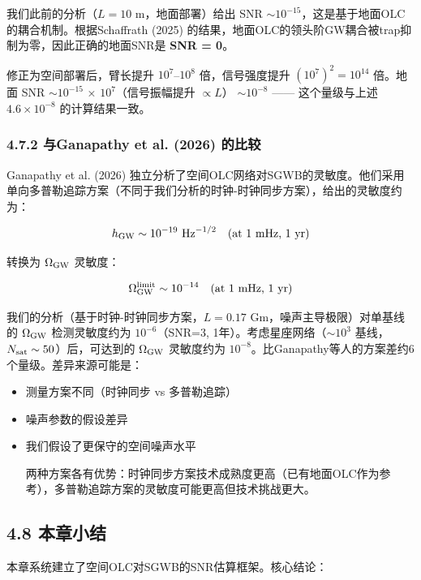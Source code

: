 \documentclass[12pt,a4paper]{article}
\begin{document}
我们此前的分析（$L = 10$ m，地面部署）给出 SNR $\sim 10^{-15}$，这是基于地面OLC的耦合机制。根据Schaffrath (2025) 的结果，地面OLC的领头阶GW耦合被trap抑制为零，因此正确的地面SNR是 \textbf{SNR = 0}。

修正为空间部署后，臂长提升 $10^7$–$10^8$ 倍，信号强度提升 $(10^7)^2 = 10^{14}$ 倍。地面 SNR $\sim 10^{-15}$ × $10^7$（信号振幅提升 $\propto L$） $\sim 10^{-8}$ —— 这个量级与上述 $4.6 \times 10^{-8}$ 的计算结果一致。

\subsubsection{4.7.2 与Ganapathy et al. (2026) 的比较}


Ganapathy et al. (2026) 独立分析了空间OLC网络对SGWB的灵敏度\cite{ref11}。他们采用单向多普勒追踪方案（不同于我们分析的时钟-时钟同步方案），给出的灵敏度约为：

$$h_{\rm GW} \sim 10^{-19} \ {\rm Hz}^{-1/2} \quad (\text{at } 1\text{ mHz, 1 yr})$$

转换为 $\Omega_{\rm GW}$ 灵敏度：

$$\Omega_{\rm GW}^{\rm limit} \sim 10^{-14} \quad (\text{at } 1\text{ mHz, 1 yr})$$

我们的分析（基于时钟-时钟同步方案，$L = 0.17$ Gm，噪声主导极限）对单基线的 $\Omega_{\rm GW}$ 检测灵敏度约为 $10^{-6}$（SNR=3, 1年）。考虑星座网络（$\sim 10^3$ 基线，$N_{\rm sat} \sim 50$）后，可达到的 $\Omega_{\rm GW}$ 灵敏度约为 $10^{-8}$。比Ganapathy等人的方案差约6个量级。差异来源可能是：
\begin{itemize}
  \item[1] 测量方案不同（时钟同步 vs 多普勒追踪）
  \item[2] 噪声参数的假设差异
  \item[3] 我们假设了更保守的空间噪声水平

两种方案各有优势：时钟同步方案技术成熟度更高（已有地面OLC作为参考），多普勒追踪方案的灵敏度可能更高但技术挑战更大。

\end{itemize}
\subsection{4.8 本章小结}


本章系统建立了空间OLC对SGWB的SNR估算框架。核心结论：
\end{document}
